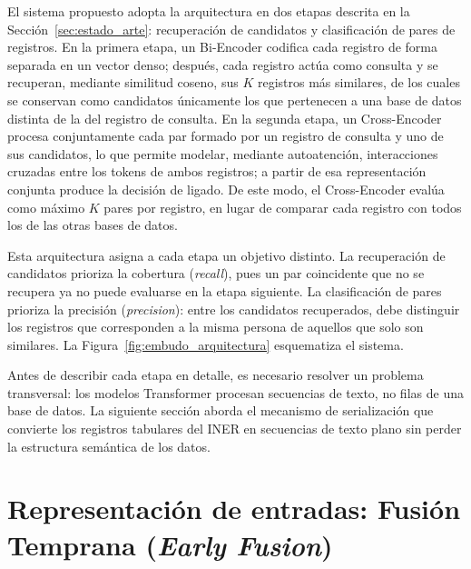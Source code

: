 

El sistema propuesto adopta la arquitectura en dos etapas descrita en la Sección~\ref{sec:estado_arte}: recuperación de candidatos y clasificación de pares de registros. En la primera etapa, un Bi-Encoder codifica cada registro de forma separada en un vector denso; después, cada registro actúa como consulta y se recuperan, mediante similitud coseno, sus $K$ registros más similares, de los cuales se conservan como candidatos únicamente los que pertenecen a una base de datos distinta de la del registro de consulta. En la segunda etapa, un Cross-Encoder procesa conjuntamente cada par formado por un registro de consulta y uno de sus candidatos, lo que permite modelar, mediante autoatención, interacciones cruzadas entre los tokens de ambos registros; a partir de esa representación conjunta produce la decisión de ligado. De este modo, el Cross-Encoder evalúa como máximo $K$ pares por registro, en lugar de comparar cada registro con todos los de las otras bases de datos.

Esta arquitectura asigna a cada etapa un objetivo distinto. La recuperación de candidatos prioriza la cobertura (\textit{recall}), pues un par coincidente que no se recupera ya no puede evaluarse en la etapa siguiente. La clasificación de pares prioriza la precisión (\textit{precision}): entre los candidatos recuperados, debe distinguir los registros que corresponden a la misma persona de aquellos que solo son similares. La Figura~\ref{fig:embudo_arquitectura} esquematiza el sistema.



Antes de describir cada etapa en detalle, es necesario resolver un problema transversal: los modelos Transformer procesan secuencias de texto, no filas de una base de datos. La siguiente sección aborda el mecanismo de serialización que convierte los registros tabulares del INER en secuencias de texto plano sin perder la estructura semántica de los datos.

\section{Representación de entradas: Fusión Temprana (\textit{Early Fusion})}
\label{sec:early_fusion}

